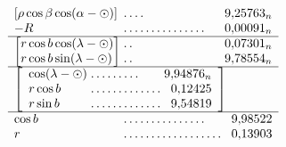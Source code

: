 \[
\begin{array}{l@{\;}l@{\;}r}
[\rho\cos\beta\cos(\alpha-\odot)]&\mathord{.}\,\mathord{.}\,\mathord{.}\,\mathord{.}&9{,}25763_n\\
-R&\mathord{.}\,\mathord{.}\,\mathord{.}\,\mathord{.}\,\mathord{.}\,\mathord{.}\,\mathord{.}\,\mathord{.}\,\mathord{.}\,\mathord{.}\,\mathord{.}\,\mathord{.}\,\mathord{.}\,\mathord{.}\,\mathord{.}&0{,}00091_n\\\hline
\left[\begin{array}{@{}l@{}}r\cos b\cos(\lambda-\odot)\\r\cos b\sin(\lambda-\odot)\end{array}\right]&
\begin{array}{@{}l@{}}\mathord{.}\,\mathord{.}\\\mathord{.}\,\mathord{.}\end{array}&
\begin{array}{@{}r@{}}0{,}07301_n\\9{,}78554_n\end{array}\\\hline
\multicolumn{3}{l}{\left[\begin{array}{l@{\;}l@{\;}r}
\cos(\lambda-\odot)&\mathord{.}\,\mathord{.}\,\mathord{.}\,\mathord{.}\,\mathord{.}\,\mathord{.}\,\mathord{.}\,\mathord{.}\,\mathord{.}&9{,}94876_n\\
r\cos b&\mathord{.}\,\mathord{.}\,\mathord{.}\,\mathord{.}\,\mathord{.}\,\mathord{.}\,\mathord{.}\,\mathord{.}\,\mathord{.}\,\mathord{.}\,\mathord{.}\,\mathord{.}\,\mathord{.}&0{,}12425\\
r\sin b&\mathord{.}\,\mathord{.}\,\mathord{.}\,\mathord{.}\,\mathord{.}\,\mathord{.}\,\mathord{.}\,\mathord{.}\,\mathord{.}\,\mathord{.}\,\mathord{.}\,\mathord{.}\,\mathord{.}&9{,}54819
\end{array}\right]}\\\hline
\cos b&\mathord{.}\,\mathord{.}\,\mathord{.}\,\mathord{.}\,\mathord{.}\,\mathord{.}\,\mathord{.}\,\mathord{.}\,\mathord{.}\,\mathord{.}\,\mathord{.}\,\mathord{.}\,\mathord{.}\,\mathord{.}\,\mathord{.}&9{,}98522\\
r&\mathord{.}\,\mathord{.}\,\mathord{.}\,\mathord{.}\,\mathord{.}\,\mathord{.}\,\mathord{.}\,\mathord{.}\,\mathord{.}\,\mathord{.}\,\mathord{.}\,\mathord{.}\,\mathord{.}\,\mathord{.}\,\mathord{.}\,\mathord{.}\,\mathord{.}\,\mathord{.}&0{,}13903
\end{array}
\]
